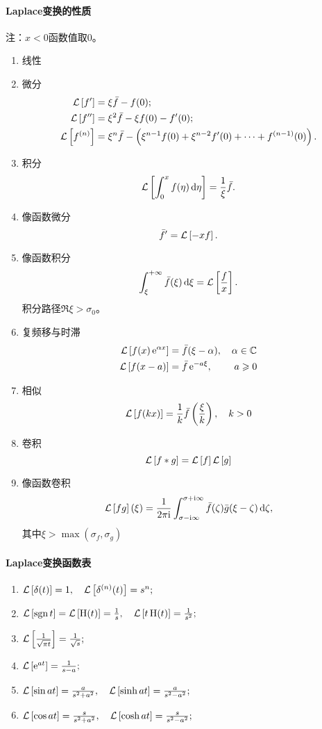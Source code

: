 \paragraph*{Laplace变换的性质}注：$x<0$函数值取0。
\begin{enumerate}
	\item 线性
	\item 微分
	\begin{align*}
		\mathcal L\left[f'\right]&=\xi\bar f-f(0);\\
		\mathcal L\left[f''\right]&=\xi^2\bar f-\xi f(0)-f'(0);\\
		\mathcal L\left[f^{(n)}\right]&=\xi^n\bar f-\left(\xi^{n-1}f(0)+\xi^{n-2}f'(0)+\cdots+f^{(n-1)}(0)\right).
	\end{align*}
	\item 积分 
	\[
		\mathcal L\left[\int_0^xf(\eta)\mathop{}\!\mathrm{d}\eta\right]=\frac1\xi\bar f.
		\]
	\item 像函数微分
	\[
		\bar f'=\mathcal L\left[-xf\right].
		\]
	\item 像函数积分
	\[
		\int_\xi^{+\infty}\bar f(\xi)\mathop{}\!\mathrm{d}\xi=\mathcal L\left[\frac fx\right].
		\]
	积分路径$\Re\xi>\sigma_0$。
	\item 复频移与时滞
	\begin{align*}
		\cl{f(x)\e{\alpha x}}&=\bar f(\xi-\alpha),\quad \alpha\in\CC\\
		\cl{f(x-a)}&=\bar f\e{-a\xi},\qquad\; a\geqslant 0 %
	\end{align*}
	\item 相似
	\[
		\mathcal L\left[f(kx)\right]=\frac1k\bar f\left(\frac\xi{k}\right),\quad k>0
		\]
	\item 卷积
	\[
		\mathcal L\left[f\ast g\right]=\mathcal L\left[f\right]\mathcal L\left[g\right]
		\]
	\item 像函数卷积
	\[
		\mathcal L\left[fg\right](\xi)=\frac1{2\pi\mathrm{i}}\int_{\sigma-\mathrm{i}\infty}^{\sigma+\mathrm{i}\infty}\bar f(\zeta)\bar g(\xi-\zeta)\mathop{}\!\mathrm{d}\zeta,
		\]
	其中$\xi>\max(\sigma_f,\sigma_g)$
\end{enumerate}
\newpage
\paragraph*{Laplace变换函数表}
\begin{enumerate}
	\item $\mathcal L\left[\mathop{}\!\delta(t)\right]=1,\quad\mathcal L\left[\mathop{}\!\delta^{(n)}(t)\right]=s^n;$
	\item $\mathcal L\left[\operatorname{sgn} t\right]=\mathcal L\left[\operatorname{H}(t)\right]=\frac1s,\quad \mathcal L\left[t\operatorname{H}(t)\right]=\frac1{s^2};$
	\item $\mathcal L\left[\frac1{\sqrt{\pi t}}\right]=\frac1{\sqrt s};$%
	\item $\mathcal L\left[\mathop{}\!\mathrm{e}^{at}\right]=\frac1{s-a};$
	\item $\mathcal L\left[\sin at\right]=\frac a{s^2+a^2},\quad \mathcal L\left[\sinh at\right]=\frac a{s^2-a^2};$
	\item $\mathcal L\left[\cos at\right]=\frac s{s^2+a^2},\quad \mathcal L\left[\cosh at\right]=\frac s{s^2-a^2};$
\end{enumerate}
\clearpage
